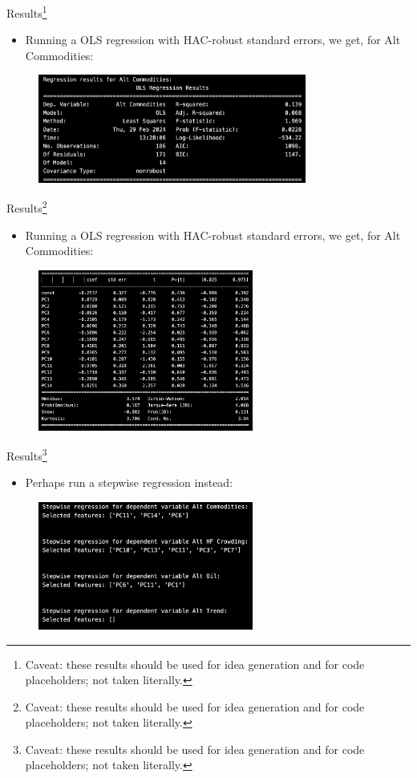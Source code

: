 \documentclass[dvipsnames,mathserif, handout]{beamer}
\begin{document}
{\begin{frame}{Results\footnote{\tiny Caveat: these results should be used for idea generation and for code placeholders; not taken literally.}}
	\begin{itemize}
		\item Running a OLS regression with HAC-robust standard errors, we get, for Alt Commodities:
	\end{itemize}
	\begin{figure}[!ht]
		\includegraphics[width=250pt]{alt_commodities1.pdf}
	\end{figure}
\end{frame}

\begin{frame}{Results\footnote{\tiny Caveat: these results should be used for idea generation and for code placeholders; not taken literally.}}
	\begin{itemize}
		\item Running a OLS regression with HAC-robust standard errors, we get, for Alt Commodities:
	\end{itemize}
	\begin{figure}[!ht]
		\includegraphics[width=200pt]{alt_commodities2.pdf}
	\end{figure}
\end{frame}

\begin{frame}{Results\footnote{\tiny Caveat: these results should be used for idea generation and for code placeholders; not taken literally.}}
	\begin{itemize}
		\item Perhaps run a stepwise regression instead:
	\end{itemize}
	\begin{figure}[!ht]
		\includegraphics[width=200pt]{stepwise_results_subset.pdf}
	\end{figure}
\end{frame}

}
\end{document}
